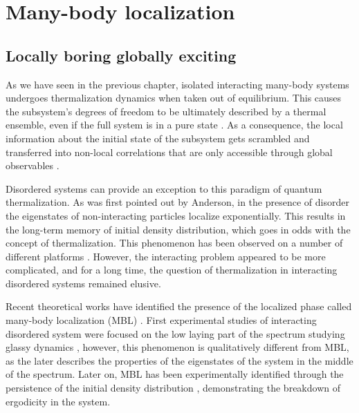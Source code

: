 
\chapter{Many-body localization}

\section{Locally boring globally exciting}
As we have seen in the previous chapter, isolated interacting many-body systems undergoes thermalization dynamics when taken out of equilibrium. This causes the subsystem's degrees of freedom to be ultimately described by a thermal ensemble, even if the full system is in a pure state \cite{Deutsch1991, Srednicki1994, Rigol2008}. As a consequence, the local information about the initial state of the subsystem gets scrambled and transferred into non-local correlations that are only accessible through global observables \cite{Neill2016, Kaufman2016, Nandkishore2015}. 

Disordered systems can provide an exception to this paradigm of quantum thermalization. As was first pointed out by Anderson, in the presence of disorder the eigenstates of non-interacting particles localize exponentially\cite{Anderson1958}. This results in the long-term memory of initial density distribution, which goes in odds with the concept of thermalization. This phenomenon has been observed on a number of different platforms \cite{Wiersma1997,  Schwartz2007, Billy2008, Roati2008, Lahini2008,Gadway2011, Kondov2011}. However, the interacting problem appeared to be more complicated, and for a long time, the question of thermalization in interacting disordered systems remained elusive. 

Recent theoretical works have identified the presence of the localized phase called many-body localization (MBL) \cite{Nandkishore2015, Gornyi2005, Basko2006, Oganesyan2007, Imbrie2016, Altman2015, Abanin2018}. First experimental studies of interacting disordered system were focused on the low laying part of the spectrum studying glassy dynamics \cite{DErrico2014, Kondov2015}, however, this phenomenon is qualitatively different from MBL, as the later describes the properties of the eigenstates of the system in the middle of the spectrum.  Later on, MBL has been experimentally identified through the persistence of the initial density distribution \cite{Schreiber2015, Smith2015, Bordia2016, Choi2016, Lueschen2017, Bordia2017}, demonstrating the breakdown of ergodicity in the system. 

